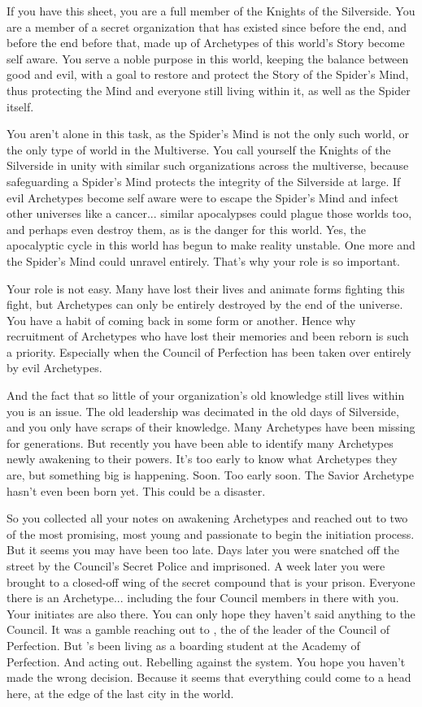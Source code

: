 \documentclass[blue]{Silversiders}
\begin{document}
\name{\bKnights{}}

If you have this sheet, you are a full member of the Knights of the Silverside. You are a member of a secret organization that has existed since before the end, and before the end before that, made up of Archetypes of this world's Story become self aware. You serve a noble purpose in this world, keeping the balance between good and evil, with a goal to restore and protect the Story of the Spider's Mind, thus protecting the Mind and everyone still living within it, as well as the Spider itself. 

You aren't alone in this task, as the Spider's Mind is not the only such world, or the only type of world in the Multiverse. You call yourself the Knights of the Silverside in unity with similar such organizations across the multiverse, because safeguarding a Spider's Mind protects the integrity of the Silverside at large. If evil Archetypes become self aware were to escape the Spider's Mind and infect other universes like a cancer... similar apocalypses could plague those worlds too, and perhaps even destroy them, as is the danger for this world. Yes, the apocalyptic cycle in this world has begun to make reality unstable. One more and the Spider's Mind could unravel entirely. That's why your role is so important.

Your role is not easy. Many have lost their lives and animate forms fighting this fight, but Archetypes can only be entirely destroyed by the end of the universe. You have a habit of coming back in some form or another. Hence why recruitment of Archetypes who have lost their memories and been reborn is such a priority. Especially when the Council of Perfection has been taken over entirely by evil Archetypes.

And the fact that so little of your organization's old knowledge still lives within you is an issue. The old leadership was decimated in the old days of Silverside, and you only have scraps of their knowledge. Many Archetypes have been missing for generations. But recently you have been able to identify many Archetypes newly awakening to their powers. It's too early to know what Archetypes they are, but something big is happening. Soon. Too early soon. The Savior Archetype hasn't even been born yet. This could be a disaster.

So you collected all your notes on awakening Archetypes and reached out to two of the most promising, most young and passionate to begin the initiation process. But it seems you may have been too late. Days later you were snatched off the street by the Council's Secret Police and imprisoned. A week later you were brought to a closed-off wing of the secret compound that is your prison. Everyone there is an Archetype... including the four Council members in there with you. Your initiates are also there. You can only hope they haven't said anything to the Council. It was a gamble reaching out to \cTruth{}, the \cTruth{\offspring} of the leader of the Council of Perfection. But \cTruth{\they}'s been living as a boarding student at the Academy of Perfection. And acting out. Rebelling against the system. You hope you haven't made the wrong decision. Because it seems that everything could come to a head here, at the edge of the last city in the world.
\end{document}
